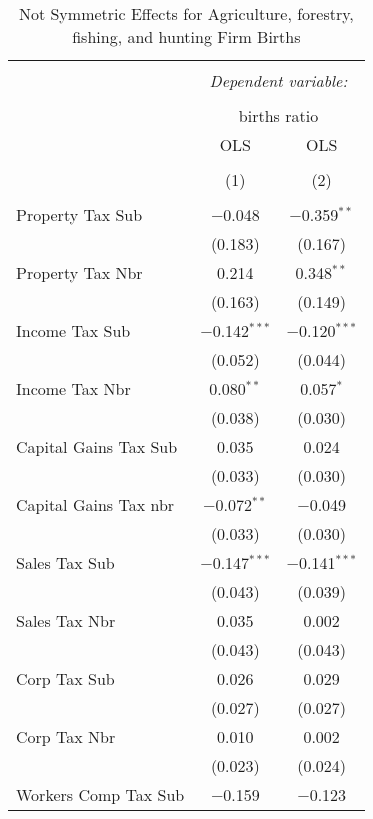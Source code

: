 
\begin{table}[!htbp] \centering 
  \caption{Not Symmetric Effects for  Agriculture, forestry, fishing, and hunting Firm Births} 
  \label{} 
\begin{tabular}{@{\extracolsep{5pt}}lcc} 
\\[-1.8ex]\hline 
\hline \\[-1.8ex] 
 & \multicolumn{2}{c}{\textit{Dependent variable:}} \\ 
\cline{2-3} 
\\[-1.8ex] & \multicolumn{2}{c}{births ratio} \\ 
 & OLS & OLS \\ 
\\[-1.8ex] & (1) & (2)\\ 
\hline \\[-1.8ex] 
 Property Tax Sub & $-$0.048 & $-$0.359$^{**}$ \\ 
  & (0.183) & (0.167) \\ 
  Property Tax Nbr & 0.214 & 0.348$^{**}$ \\ 
  & (0.163) & (0.149) \\ 
  Income Tax Sub & $-$0.142$^{***}$ & $-$0.120$^{***}$ \\ 
  & (0.052) & (0.044) \\ 
  Income Tax Nbr & 0.080$^{**}$ & 0.057$^{*}$ \\ 
  & (0.038) & (0.030) \\ 
  Capital Gains Tax Sub & 0.035 & 0.024 \\ 
  & (0.033) & (0.030) \\ 
  Capital Gains Tax nbr & $-$0.072$^{**}$ & $-$0.049 \\ 
  & (0.033) & (0.030) \\ 
  Sales Tax Sub & $-$0.147$^{***}$ & $-$0.141$^{***}$ \\ 
  & (0.043) & (0.039) \\ 
  Sales Tax Nbr & 0.035 & 0.002 \\ 
  & (0.043) & (0.043) \\ 
  Corp Tax Sub & 0.026 & 0.029 \\ 
  & (0.027) & (0.027) \\ 
  Corp Tax Nbr & 0.010 & 0.002 \\ 
  & (0.023) & (0.024) \\ 
  Workers Comp Tax Sub & $-$0.159 & $-$0.123 \\ 

\end{tabular}
\end{table}
